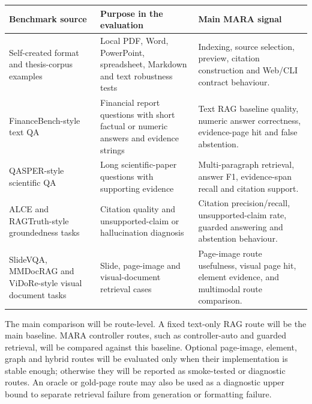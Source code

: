\documentclass[a4paper,11pt]{article}
\begin{document}
\begin{center}
\scriptsize
\begin{tabularx}{\textwidth}{p{}p{}X}
\toprule
Benchmark source & Purpose in the evaluation & Main MARA signal \\
\midrule
Self-created format and thesis-corpus examples & Local PDF, Word, PowerPoint, spreadsheet, Markdown and text robustness tests & Indexing, source selection, preview, citation construction and Web/CLI contract behaviour. \\
FinanceBench-style text QA \cite{islam2023financebench} & Financial report questions with short factual or numeric answers and evidence strings & Text RAG baseline quality, numeric answer correctness, evidence-page hit and false abstention. \\
QASPER-style scientific QA \cite{dasigi2021qasper} & Long scientific-paper questions with supporting evidence & Multi-paragraph retrieval, answer F1, evidence-span recall and citation support. \\
ALCE and RAGTruth-style groundedness tasks \cite{gao2023alce, niu2024ragtruth} & Citation quality and unsupported-claim or hallucination diagnosis & Citation precision/recall, unsupported-claim rate, guarded answering and abstention behaviour. \\
SlideVQA, MMDocRAG and ViDoRe-style visual document tasks \cite{tanaka2023slidevqa, dong2025mmdocrag, mace2025vidore} & Slide, page-image and visual-document retrieval cases & Page-image route usefulness, visual page hit, element evidence, and multimodal route comparison. \\
\bottomrule
\end{tabularx}
\end{center}

The main comparison will be route-level. A fixed text-only RAG route will be the main baseline. MARA controller routes, such as controller-auto and guarded retrieval, will be compared against this baseline. Optional page-image, element, graph and hybrid routes will be evaluated only when their implementation is stable enough; otherwise they will be reported as smoke-tested or diagnostic routes. An oracle or gold-page route may also be used as a diagnostic upper bound to separate retrieval failure from generation or formatting failure.
\end{document}
